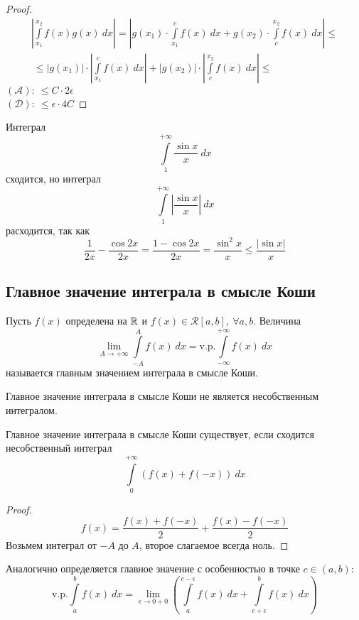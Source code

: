 \begin{proof}
    \begin{multline*}
        \left|\int\limits_{x_1}^{x_2}f(x)g(x)\ dx\right|=\left|g(x_1)\cdot \int\limits_{x_1}^{c}f(x)\ dx+g(x_2)\cdot \int\limits_{c}^{x_2}f(x)\ dx\right|\leq\\\
        \leq |g(x_1)|\cdot \left|\int\limits_{x_1}^{c}f(x)\ dx\right|+|g(x_2)|\cdot \left|\int\limits_{c}^{x_2}f(x)\ dx\right|\leq
    \end{multline*} 
    $(\mathcal{A}):\ \leq C\cdot 2\epsilon$\\
    $(\mathcal{D}):\ \leq \epsilon \cdot 4C$
\end{proof} 
\begin{example} Интеграл 
    \[\int\limits_{1}^{+\infty}\frac{\sin{x}}{x}\ dx\]
    сходится, но интеграл
    \[\int\limits_{1}^{+\infty}\left|\frac{\sin{x}}{x}\right|\ dx\]
    расходится, так как
    \[\frac{1}{2x}-\frac{\cos{2x}}{2x}=\frac{1-\cos{2x}}{2x}=\frac{\sin^2{x}}{x}\leq \frac{|\sin{x}|}{x}\]
\end{example}
\subsection{Главное значение интеграла в смысле Коши}
\begin{definition}
    Пусть $f(x)$ определена на $\mathbb{R}$ и $f(x)\in \mathcal{R}[a,b],\ \forall a,b$. Величина
    \[\lim\limits_{A\to +\infty}\int\limits_{-A}^{A}f(x)\ dx=\text{v.p.} \int\limits_{-\infty}^{+\infty}f(x)\ dx\]
    называется главным значением интеграла в смысле Коши. %
\end{definition} 
\begin{comm}
    Главное значение интеграла в смысле Коши не является несобственным интегралом.
\end{comm} 
\begin{theorem}
    Главное значение интеграла в смысле Коши существует, если сходится несобственный интеграл
    \[\int\limits_{0}^{+\infty}(f(x)+f(-x))\ dx\]
\end{theorem} 
\begin{proof}
    \[f(x)=\frac{f(x)+f(-x)}{2}+\frac{f(x)-f(-x)}{2}\]
    Возьмем интеграл от $-A$ до $A$, второе слагаемое всегда ноль.
\end{proof} 
\begin{comm}
    Аналогично определяется главное значение с особенностью в точке $c\in (a,b)$:
    \[\text{v.p.}\int\limits_{a}^{b}f(x)\ dx=\lim\limits_{\epsilon\to 0+0}\left(\int\limits_{a}^{c-\epsilon}f(x)\ dx+\int\limits_{c+\epsilon}^{b}f(x)\ dx\right)\]
\end{comm} 